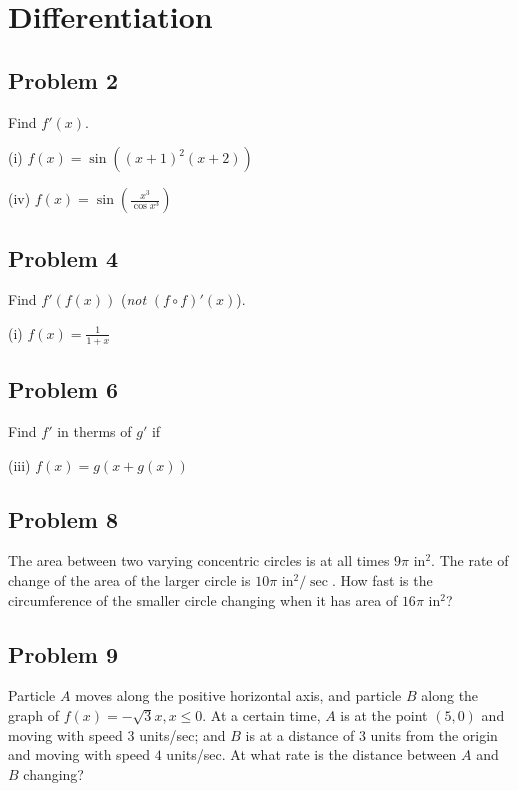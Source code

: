 
\section{Differentiation}

\subsection*{Problem 2}
Find $f'(x)$.

\vs

(i) $f(x)=\sin((x+1)^2(x+2))$

\vs

(iv) $f(x)=\sin\left(\frac{x^3}{\cos x^3}\right)$


\subsection*{Problem 4}
Find $f'(f(x))$ (\textit{not} $(f\circ f)'(x)$).

\vs

(i) $f(x)=\frac{1}{1+x}$

\subsection*{Problem 6}
Find $f'$ in therms of $g'$ if

\vs

(iii) $f(x)=g(x+g(x))$

\subsection*{Problem 8}
The area between two varying concentric circles is at all times $9\pi$
in$^{2}$. The rate of change of the area of the larger circle is
$10\pi$ in$^2/\sec$. How fast is the circumference of the smaller circle
changing when it has area of $16\pi$ in$^2$?

\subsection*{Problem 9}
Particle $A$ moves along the positive horizontal axis, and particle
$B$ along the graph of $f(x)=-\sqrt{3}x,x\leq0$. At a certain time,
$A$ is at the point $(5,0)$ and moving with speed $3$ units/sec; and
$B$ is at a distance of 3 units from the origin and moving with speed
$4$ units/sec. At what rate is the distance between $A$ and $B$
changing?

